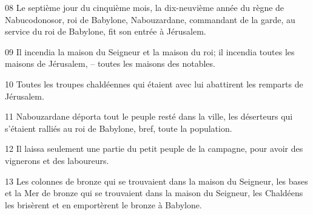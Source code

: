 
08 Le septième jour du cinquième mois, la dix-neuvième année du règne de Nabucodonosor, roi de Babylone, Nabouzardane, commandant de la garde, au service du roi de Babylone, fit son entrée à Jérusalem.

09 Il incendia la maison du Seigneur et la maison du roi; il incendia toutes les maisons de Jérusalem, – toutes les maisons des notables.

10 Toutes les troupes chaldéennes qui étaient avec lui abattirent les remparts de Jérusalem.

11 Nabouzardane déporta tout le peuple resté dans la ville, les déserteurs qui s’étaient ralliés au roi de Babylone, bref, toute la population.

12 Il laissa seulement une partie du petit peuple de la campagne, pour avoir des vignerons et des laboureurs.

13 Les colonnes de bronze qui se trouvaient dans la maison du Seigneur, les bases et la Mer de bronze qui se trouvaient dans la maison du Seigneur, les Chaldéens les brisèrent et en emportèrent le bronze à Babylone.